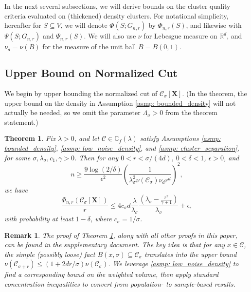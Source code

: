 \documentclass{article}
\newcommand{\Reals}{\mathbb{R}}
\newcommand{\Rd}{\Reals^d}
\newcommand{\1}{\mathbf{1}}
\newcommand{\Xbf}{\mathbf{X}}
\newcommand{\Cbb}{\mathbb{C}}
\newcommand{\Cset}{\mathcal{C}}
\newcommand{\Csig}{\Cset_{\sigma}}
\theoremstyle{aldenthm}
\newtheorem{theorem}{Theorem}
\theoremstyle{aldenrmrk}
\newtheorem{remark}{Remark}
\begin{document}
In the next several subsections, we will derive bounds on the cluster quality
criteria evaluated on (thickened) density clusters. For notational simplicity,
hereafter for $S \subseteq V$, we will denote $\Phi(S; G_{n,r})$ by
$\Phi_{n,r}(S)$, and likewise with $\Psi(S; G_{n,r})$ and $\Psi_{n,r}(S)$. We
will also use $\nu$ for Lebesgue measure on $\Rd$, and $\nu_d = \nu(B)$ for 
the measure of the unit ball $B=B(0,1)$. 

\subsection{Upper Bound on Normalized Cut}

We begin by upper bounding the normalized cut of $\Cset_\sigma[\Xbf]$.  (In the
theorem, the upper bound on the density in Assumption \ref{asmp: 
  bounded_density} will not actually be needed, so we omit the parameter
$\Lambda_\sigma>0$ from the theorem statement.) 

\begin{theorem}
\label{thm: conductance_upper_bound}
Fix $\lambda > 0$, and let $\Cset \in \Cbb_f(\lambda)$ satisfy
Assumptions \ref{asmp: bounded_density}, \ref{asmp: low_noise_density}, and
\ref{asmp: cluster_separation}, for some 
$\sigma, \lambda_{\sigma}, c_1, \gamma > 0$. Then for any $0 < r <
\sigma/(4d)$, $0 < \delta < 1$, $\epsilon > 0$, and
\begin{equation}
\label{eqn: conductance_sample_complexity}
n \geq \frac{9\log(2/\delta)}{\epsilon^2}\left(\frac{1}
  { \lambda_{\sigma}^2\nu(\Csig) \nu_d r^d}\right)^2,
\end{equation}
we have
\begin{equation}
  \label{eqn: conductance_additive_error_bound}
  \frac{\Phi_{n,r}(\Csig[\mathbf{X}])}{r} \leq 4 c_{\sigma} d
  \frac{\lambda}{\lambda_{\sigma}} \frac{(\lambda_{\sigma} -
    \frac{r^{\gamma}}{\gamma+1})}{\lambda_{\sigma}} + \epsilon, 
\end{equation}
with probability at least $1-\delta$, where $c_{\sigma} = 1 / \sigma$. 
\end{theorem}

\begin{remark}
The proof of Theorem \ref{thm: conductance_upper_bound}, along with all other
proofs in this paper, can be found in the supplementary document. The key 
idea is that for any $x \in \Cset$, the simple (possibly loose) fact
$B(x,\sigma) \subseteq \Csig$ translates into the upper bound $\nu(\Cset_{\sigma
  + r}) \leq (1 + 2d r /\sigma)\nu(\Csig)$. We leverage \ref{asmp:
  low_noise_density} to find a corresponding bound on the weighted volume,
then apply standard concentration inequalities to convert from population-
to sample-based results.  
\end{remark}
\end{document}
